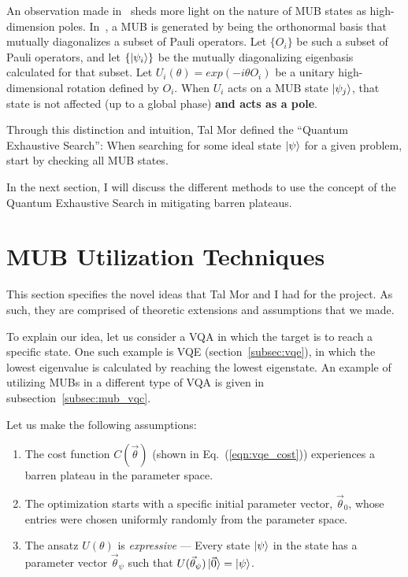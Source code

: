 \documentclass[a4paper,12pt]{article}
\newcommand{\thetas}{\vec{\theta}}
\begin{document}
An observation made in~\cite{lawrence_mutually_2002} sheds more light on the nature of MUB states as high-dimension poles.
In~\cite{lawrence_mutually_2002}, a MUB is generated by being the orthonormal basis that mutually diagonalizes a subset of Pauli operators.
Let $\{O_i\}$ be such a subset of Pauli operators, and let $\{\ket{\psi_i}\}$ be the mutually diagonalizing eigenbasis calculated for that subset.
Let $U_i(\theta) = exp(-i\theta O_i)$ be a unitary high-dimensional rotation defined by $O_i$.
When $U_i$ acts on a MUB state $\ket{\psi_j}$, that state is not affected (up to a global phase) \textbf{and acts as a pole}.

Through this distinction and intuition, Tal Mor defined the ``Quantum Exhaustive Search'':
When searching for some ideal state $\ket{\psi}$ for a given problem, start by checking all MUB states.

In the next section, I will discuss the different methods to use the concept of the Quantum Exhaustive Search in mitigating barren plateaus.


\section{MUB Utilization Techniques} \label{sec:mub_use}
This section specifies the novel ideas that Tal Mor and I had for the project. As such, they are comprised of theoretic extensions and assumptions that we made.

To explain our idea, let us consider a VQA in which the target is to reach a specific state.
One such example is VQE (section~\ref{subsec:vqe}), in which the lowest eigenvalue is calculated by reaching the lowest eigenstate.
An example of utilizing MUBs in a different type of VQA is given in subsection~\ref{subsec:mub_vqc}.

Let us make the following assumptions:
\begin{enumerate}
    \item The cost function $C(\thetas)$ (shown in Eq.~(\ref{eqn:vqe_cost})) experiences a barren plateau in the parameter space. 
    \item The optimization starts with a specific initial parameter vector, $\thetas_0$, whose entries were chosen uniformly randomly from the parameter space.
    \item The ansatz $U(\theta)$ is \emph{expressive} --- Every state $\ket{\psi}$ in the state has a parameter vector $\thetas_\psi$ such that $U(\thetas_\psi)\ket{\vec{0}} = \ket{\psi}$.
    \label{itm:expressive}
\end{enumerate}
\end{document}
